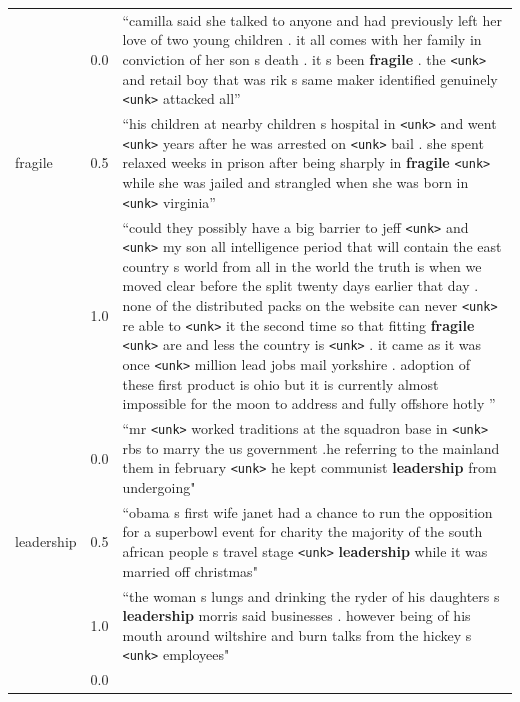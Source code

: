 \documentclass[11pt,a4paper]{article}
\begin{document}
\begin{table}[t]
\begin{tabularx}{\linewidth}{lrX}
      & 0.0 & ``camilla said she talked to anyone and had previously left her love of two young children . it all comes with
her family in conviction of her son s death . it s been \textbf{fragile} . the \verb+<unk>+ and retail boy
that was rik s same maker identified genuinely \verb+<unk>+ attacked all''\\
      fragile & 0.5 & ``his children at nearby children s hospital in \verb+<unk>+ and went \verb+<unk>+ years after he was arrested on \verb+<unk>+ bail
. she spent relaxed weeks in prison after being sharply in \textbf{fragile} \verb+<unk>+ while she was jailed and strangled when
she was born in \verb+<unk>+ virginia''\\
      & 1.0 & ``could they possibly have a big barrier to jeff \verb+<unk>+ and \verb+<unk>+ my son all intelligence period that will
contain the east country s world from all in the world the truth is when we moved clear before the
split twenty days earlier that day . none of the distributed packs on the website can never \verb+<unk>+ re able
to \verb+<unk>+ it the second time so that fitting \textbf{fragile} \verb+<unk>+ are and less the country is \verb+<unk>+ . it
came as it was once \verb+<unk>+ million lead jobs mail yorkshire . adoption of these first product is ohio but
it is currently almost impossible for the moon to address and fully offshore hotly ''\\
    \midrule
      & 0.0 & ``mr \verb+<unk>+ worked traditions at the squadron base in \verb+<unk>+ rbs to marry the us government .he referring to the mainland them in february \verb+<unk>+ he kept communist \textbf{leadership} from undergoing"
\\
    leadership & 0.5 & ``obama s first wife janet had a chance to run the opposition for a superbowl event for charity the majority of the south african people s travel stage \verb+<unk>+ \textbf{leadership} while it was married off christmas"
\\
     & 1.0 &  ``the woman s lungs and drinking the ryder of his daughters s \textbf{leadership} morris said businesses . however being  of his mouth around wiltshire and burn talks from the hickey s \verb+<unk>+ employees"\\
      \midrule
      & 0.0 & 


\end{tabularx}
\end{table}
\end{document}
